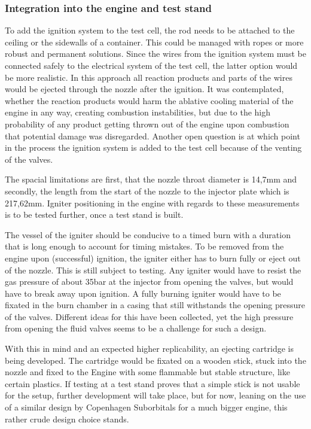        \subsubsection{Integration into the engine and test stand}

        To add the ignition system to the test cell, the rod needs to be attached to the ceiling or the sidewalls of a container. This could be managed with ropes or more robust and permanent solutions. Since the wires from the ignition system must be connected safely to the electrical system of the test cell, the latter option would be more realistic. In this approach all reaction products and parts of the wires would be ejected through the nozzle after the ignition. It was contemplated, whether the reaction products would harm the ablative cooling material of the engine in any way, creating combustion instabilities, but due to the high probability of any product getting thrown out of the engine upon combustion that potential damage was disregarded. Another open question is at which point in the process the ignition system is added to the test cell because of the venting of the valves. \par

        The spacial limitations are first, that the nozzle throat diameter is 14,7mm and secondly, the length from the start of the nozzle to the injector plate which is 217,62mm. Igniter positioning in the engine with regards to these measurements is to be tested further, once a test stand is built. \par
        The vessel of the igniter should be conducive to a timed burn with a duration that is long enough to account for timing mistakes.
        To be removed from the engine upon (successful) ignition, the igniter either has to burn fully or eject out of the nozzle. This is still subject to testing. Any igniter would have to resist the gas pressure of about 35bar at the injector from opening the valves, but would have to break away upon ignition.        
        A fully burning igniter would have to be fixated in the burn chamber in a casing that still withstands the opening pressure of the valves. Different ideas for this have been collected, yet the high pressure from opening the fluid valves seems to be a challenge for such a design. \par
        
        With this in mind and an expected higher replicability, an ejecting cartridge is being developed. The cartridge would be fixated on a wooden stick, stuck into the nozzle and fixed to the Engine with some flammable but stable structure, like certain plastics. If testing at a test stand proves that a simple stick is not usable for the setup, further development will take place, but for now, leaning on the use of a similar design by Copenhagen Suborbitals for a much bigger engine, this rather crude design choice stands.\par
        
